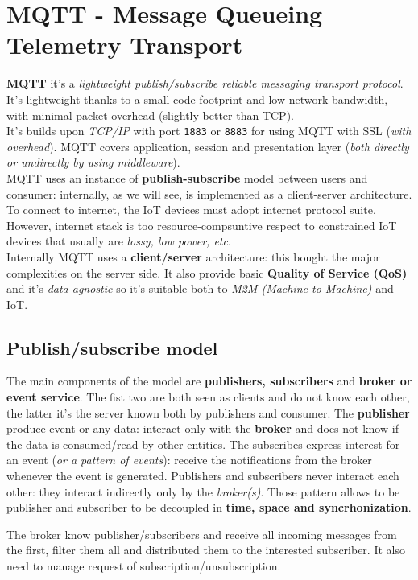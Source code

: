 \documentclass[10pt,a4paper]{report}
\theoremstyle{definition}
\begin{document}
\chapter{MQTT - Message Queueing Telemetry Transport}\label{sec:mqtt---message-queueing-telemetry-transport}

\textbf{MQTT} it's  a \textit{lightweight publish/subscribe reliable messaging transport protocol}. It's lightweight thanks to a small code footprint and low network bandwidth, with minimal packet overhead (slightly better than TCP).\\
It's builds upon \textit{TCP/IP} with port \texttt{1883} or \texttt{8883} for using MQTT with SSL (\textit{with overhead}).
MQTT covers application, session and presentation layer (\textit{both directly or undirectly by using middleware}).\\
MQTT uses an instance of \textbf{publish-subscribe} model between users and consumer: internally, as we will see, is implemented as a client-server architecture.
To connect to internet, the IoT devices must adopt internet protocol suite. However, internet stack is too resource-compsuntive respect to constrained IoT devices that usually are \textit{lossy, low power, etc}.\\
Internally MQTT uses a \textbf{client/server} architecture: this bought the major complexities on the server side. It also provide basic \textbf{Quality of Service (QoS)} and it's \textit{data agnostic} so it's suitable both to \textit{M2M (Machine-to-Machine)} and IoT.
\section{Publish/subscribe model}\label{sec:publishsubscribe-model}
The main components of the model are \textbf{publishers, subscribers} and \textbf{broker or event service}. The fist two are both seen as clients and do not know each other, the latter it's the server known both by publishers and consumer.
The \textbf{publisher} produce event or any data: interact only with the \textbf{broker} and does not know if the data is consumed/read by other entities.
The subscribes express interest for an event (\textit{or a pattern of events}): receive the notifications from the broker whenever the event is generated.
Publishers and subscribers never interact each other: they interact indirectly only by the \textit{broker(s)}.
Those pattern allows to be publisher and subscriber to be decoupled in \textbf{time, space and syncrhonization}.

The broker know publisher/subscribers and receive all incoming messages from the first, filter them all and distributed them to the interested subscriber. It also need to manage request of subscription/unsubscription.
\end{document}
